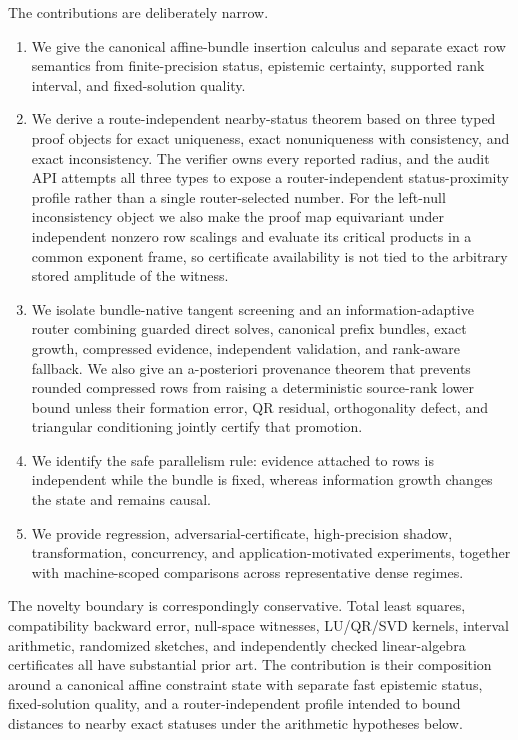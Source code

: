 \documentclass[11pt]{article}
\theoremstyle{definition}
\begin{document}
The contributions are deliberately narrow.
\begin{enumerate}[label=(\roman*)]
\item We give the canonical affine-bundle insertion calculus and separate exact row semantics from finite-precision status, epistemic certainty, supported rank interval, and fixed-solution quality.
\item We derive a route-independent nearby-status theorem based on three typed proof objects for exact uniqueness, exact nonuniqueness with consistency, and exact inconsistency. The verifier owns every reported radius, and the audit API attempts all three types to expose a router-independent status-proximity profile rather than a single router-selected number. For the left-null inconsistency object we also make the proof map equivariant under independent nonzero row scalings and evaluate its critical products in a common exponent frame, so certificate availability is not tied to the arbitrary stored amplitude of the witness.
\item We isolate bundle-native tangent screening and an information-adaptive router combining guarded direct solves, canonical prefix bundles, exact growth, compressed evidence, independent validation, and rank-aware fallback. We also give an a-posteriori provenance theorem that prevents rounded compressed rows from raising a deterministic source-rank lower bound unless their formation error, QR residual, orthogonality defect, and triangular conditioning jointly certify that promotion.
\item We identify the safe parallelism rule: evidence attached to rows is independent while the bundle is fixed, whereas information growth changes the state and remains causal.
\item We provide regression, adversarial-certificate, high-precision shadow, transformation, concurrency, and application-motivated experiments, together with machine-scoped comparisons across representative dense regimes.
\end{enumerate}

The novelty boundary is correspondingly conservative. Total least squares, compatibility backward error, null-space witnesses, LU/QR/SVD kernels, interval arithmetic, randomized sketches, and independently checked linear-algebra certificates all have substantial prior art. The contribution is their composition around a canonical affine constraint state with separate fast epistemic status, fixed-solution quality, and a router-independent profile intended to bound distances to nearby exact statuses under the arithmetic hypotheses below.
\end{document}
